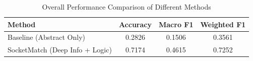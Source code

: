 \begin{table}[htbp]
\centering
\caption{Overall Performance Comparison of Different Methods}
\label{tab:main_results}
\begin{tabular}{lccc}
\toprule
\textbf{Method} & \textbf{Accuracy} & \textbf{Macro F1} & \textbf{Weighted F1} \\
\midrule
Baseline (Abstract Only) & 0.2826 & 0.1506 & 0.3561 \\
SocketMatch (Deep Info + Logic) & 0.7174 & 0.4615 & 0.7252 \\
\bottomrule
\end{tabular}
\end{table}